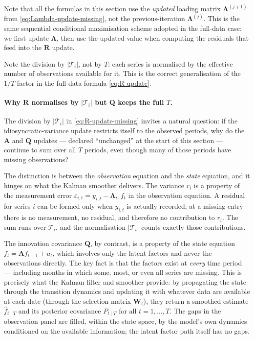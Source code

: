 \documentclass[11pt, a4paper, oneside]{article}
\newcommand{\mL}{\boldsymbol{\Lambda}}
\newcommand{\mR}{\mathbf{R}}
\begin{document}
Note that all the formulas in this section use the \emph{updated}
loading matrix $\mL^{(j+1)}$ from \eqref{eq:Lambda-update-missing},
not the previous-iteration $\mL^{(j)}$. This is the same sequential
conditional maximisation scheme adopted in the full-data case: we first update $\mL$, then use the
updated value when computing the residuals that feed into the $\mR$
update.

Note the division by $|\mathcal{T}_i|$, not by $T$: each series is
normalised by the effective number of observations available for it.
This is the correct generalisation of the $1/T$ factor in the
full-data formula \eqref{eq:R-update}.

\paragraph{Why $\mathbf{R}$ normalises by $|\mathcal{T}_i|$ but
$\mathbf{Q}$ keeps the full $T$.}
The division by $|\mathcal{T}_i|$ in \eqref{eq:R-update-missing}
invites a natural question: if the idiosyncratic-variance update
restricts itself to the observed periods, why do the $\mathbf{A}$ and
$\mathbf{Q}$ updates — declared ``unchanged'' at the start of this
section — continue to sum over all $T$ periods, even though many of
those periods have missing observations?

The distinction is between the \emph{observation} equation and the
\emph{state} equation, and it hinges on what the Kalman smoother
delivers. The variance $r_i$ is a property of the measurement error
$\varepsilon_{i,t} = y_{i,t} - \mL_{i\cdot} f_t$ in the observation
equation. A residual for series $i$ can be formed only when $y_{i,t}$
is actually recorded; at a missing entry there is no measurement, no
residual, and therefore no contribution to $r_i$. The sum runs over
$\mathcal{T}_i$, and the normalisation $|\mathcal{T}_i|$ counts
exactly those contributions.

The innovation covariance $\mathbf{Q}$, by contrast, is a property of
the state equation $f_t = \mathbf{A} f_{t-1} + u_t$, which involves
only the latent factors and never the observations directly. The key
fact is that the factors exist at \emph{every} time period — including
months in which some, most, or even all series are missing. This is
precisely what the Kalman filter and smoother provide: by propagating
the state through the transition dynamics and updating it with
whatever data are available at each date (through the selection
matrix $\mathbf{W}_t$), they return a smoothed estimate
$\hat{f}_{t\mid T}$ and its posterior covariance $P_{t \mid T}$ for
all $t = 1, \dots, T$. The gaps in the observation panel are filled,
within the state space, by the model's own dynamics conditioned on
the available information; the latent factor path itself has no gaps.
\end{document}
